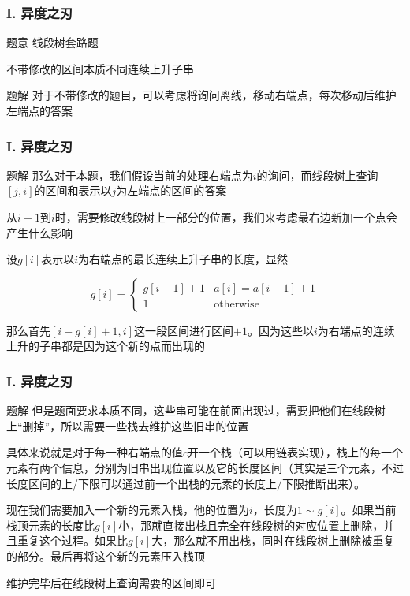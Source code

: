 \renewcommand{\problemname}{I. 异度之刃}

\begin{frame}\frametitle{\problemname}

\begin{block}{题意}
    线段树套路题

    不带修改的区间本质不同连续上升子串
\end{block}

\begin{block}{题解}
    对于不带修改的题目，可以考虑将询问离线，移动右端点，每次移动后维护左端点的答案
\end{block}

\end{frame}

\begin{frame}\frametitle{\problemname}
\begin{block}{题解}
    那么对于本题，我们假设当前的处理右端点为$i$的询问，而线段树上查询$[j,i]$的区间和表示以$j$为左端点的区间的答案

    从$i-1$到$i$时，需要修改线段树上一部分的位置，我们来考虑最右边新加一个点会产生什么影响

    设$g[i]$表示以$i$为右端点的最长连续上升子串的长度，显然 
    
    $$
    g[i] = \begin{cases}g[i-1]+1 & a[i]=a[i-1]+1\\ 1 & \text{otherwise}\end{cases}
    $$

    那么首先$[i-g[i]+1,i]$这一段区间进行区间$+1$。因为这些以$i$为右端点的连续上升的子串都是因为这个新的点而出现的
\end{block}
\end{frame}

\begin{frame}\frametitle{\problemname}
    \begin{block}{题解}
    但是题面要求本质不同，这些串可能在前面出现过，需要把他们在线段树上“删掉”，所以需要一些栈去维护这些旧串的位置

    具体来说就是对于每一种右端点的值$c$开一个栈（可以用链表实现），栈上的每一个元素有两个信息，分别为旧串出现位置以及它的长度区间（其实是三个元素，不过长度区间的上/下限可以通过前一个出栈的元素的长度上/下限推断出来）。
    
    现在我们需要加入一个新的元素入栈，他的位置为$i$，长度为$1 \sim g[i]$。如果当前栈顶元素的长度比$g[i]$小，那就直接出栈且完全在线段树的对应位置上删除，并且重复这个过程。如果比$g[i]$大，那么就不用出栈，同时在线段树上删除被重复的部分。最后再将这个新的元素压入栈顶

    维护完毕后在线段树上查询需要的区间即可
\end{block}
\end{frame}